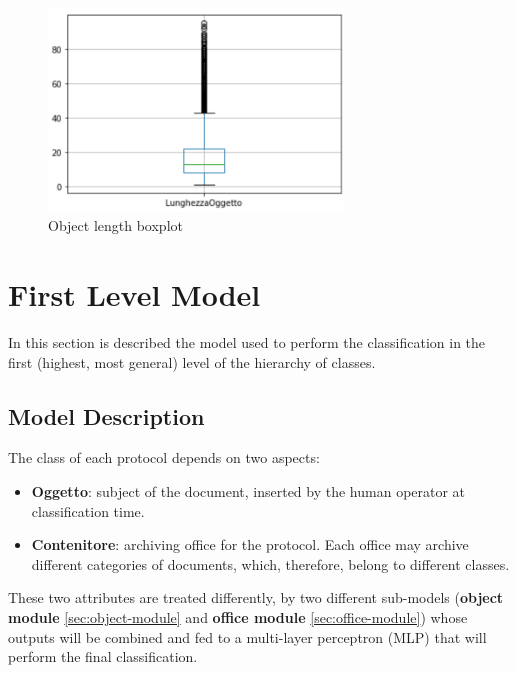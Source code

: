 \documentclass[12pt]{article}
\begin{document}
\begin{figure}[ht!]
    	    \begin{center}
        \includegraphics[width=0.7\textwidth]{object_length.png}
            \end{center}
        \label{fig:objectlength}
        \caption{Object length boxplot}
\end{figure}

\section{First Level Model}\label{sec:1lev-model}
In this section is described the model used to perform the classification in the first (highest, most general) level of the hierarchy of classes.

\subsection{Model Description}\label{sec:model-desc}
The class of each protocol depends on two aspects:
\begin{itemize}
    \item \textbf{Oggetto}: subject of the document, inserted by the human operator at classification time.
    \item \textbf{Contenitore}: archiving office for the protocol. Each office may archive different categories of documents, which, therefore, belong to different classes.
\end{itemize}
These two attributes are treated differently, by two different sub-models (\textbf{object module} \ref{sec:object-module} and \textbf{office module} \ref{sec:office-module}) whose outputs will be combined and fed to a multi-layer perceptron (MLP) that will perform the final classification.
\end{document}
